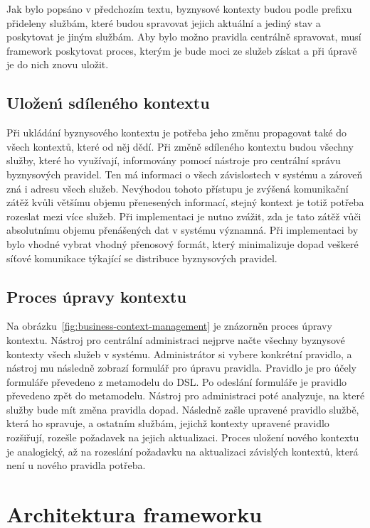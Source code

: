 Jak bylo popsáno v předchozím textu, byznysové kontexty budou podle prefixu přideleny službám,
které budou spravovat jejich aktuální a jediný stav a poskytovat je jiným službám. Aby bylo
možno pravidla centrálně spravovat, musí framework poskytovat proces, kterým je bude moci ze
služeb získat a při úpravě je do nich znovu uložit.

\subsection{Uložen\'{\i} sdíleného kontextu}\label{sec:saving-context}

Při ukládání byznysového kontextu je potřeba jeho změnu propagovat také do všech kontextů, které od něj dědí.
Při změně sdíleného kontextu budou všechny služby, které ho využívají, informovány pomocí nástroje pro
centrální správu byznysových pravidel. Ten má informaci o všech závislostech v systému a zároveň zná i adresu všech
služeb. Nevýhodou tohoto přístupu je zvýšená komunikační zátěž kvůli většímu objemu přenesených informací, stejný kontext
je totiž potřeba rozeslat mezi více služeb. Při implementaci je nutno zvážit, zda je tato zátěž vůči absolutnímu objemu
přenášených dat v systému významná. Při implementaci by bylo vhodné vybrat vhodný přenosový formát, který minimalizuje dopad
veškeré síťové komunikace týkající se distribuce byznysových pravidel.

\subsection{Proces úpravy kontextu}

Na obrázku~\ref{fig:business-context-management} je znázorněn proces úpravy kontextu. Nástroj pro
centrální administraci nejprve načte všechny byznysové kontexty všech služeb v systému. Administrátor
si vybere konkrétní pravidlo, a nástroj mu následně zobrazí formulář pro úpravu pravidla.
Pravidlo je pro účely formuláře převedeno z metamodelu do \gls{DSL}. Po odeslání formuláře je pravidlo
převedeno zpět do metamodelu. Nástroj pro administraci poté analyzuje, na které služby bude mít změna pravidla
dopad. Následně zašle upravené pravidlo službě, která ho spravuje, a ostatním službám, jejichž kontexty upravené
pravidlo rozšiřují, rozešle požadavek na jejich aktualizaci. Proces uložení nového kontextu je analogický, až na
rozeslání požadavku na aktualizaci závislých kontextů, která není u nového pravidla potřeba.

\section{Architektura frameworku}\label{sec:architecture}

